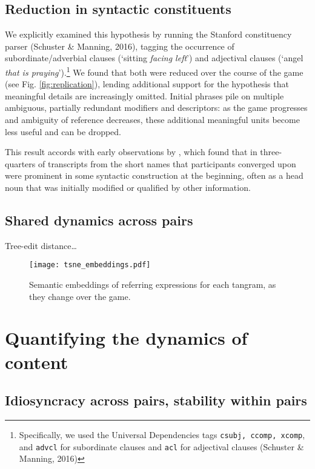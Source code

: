 \subsection{Reduction in syntactic constituents}
We explicitly examined this hypothesis by running the Stanford
constituency parser (Schuster \& Manning, 2016), tagging the occurrence
of subordinate/adverbial clauses (`sitting \emph{facing left}') and
adjectival clauses (`angel \emph{that is praying}').\footnote{Specifically,
  we used the Universal Dependencies tags \texttt{csubj, ccomp, xcomp},
  and \texttt{advcl} for subordinate clauses and \texttt{acl} for
  adjectival clauses (Schuster \& Manning, 2016)} We found that both
were reduced over the course of the game (see Fig.
\ref{fig:replication}), lending additional support for the hypothesis
that meaningful details are increasingly omitted. Initial phrases pile
on multiple ambiguous, partially redundant modifiers and descriptors: as
the game progresses and ambiguity of reference decreases, these
additional meaningful units become less useful and can be dropped.

This result accords with early observations by \cite{Carroll80_NamingHedges}, which found that in three-quarters of transcripts from \cite{KraussWeinheimer64_ReferencePhrases} the short names that participants converged upon were prominent in some syntactic construction at the beginning, often as a head noun that was initially modified or qualified by other information. 

\subsection{Shared dynamics across pairs}

Tree-edit distance\dots

\begin{figure}[t]
\centering
\texttt{[image: tsne\_embeddings.pdf]}
\caption{Semantic embeddings of referring expressions for each tangram, as they change over the game. }
\label{fig:reduction}
\end{figure}

\section{Quantifying the dynamics of content}

\subsection{Idiosyncracy across pairs, stability within pairs}
\label{arbitrariness-and-stability}

